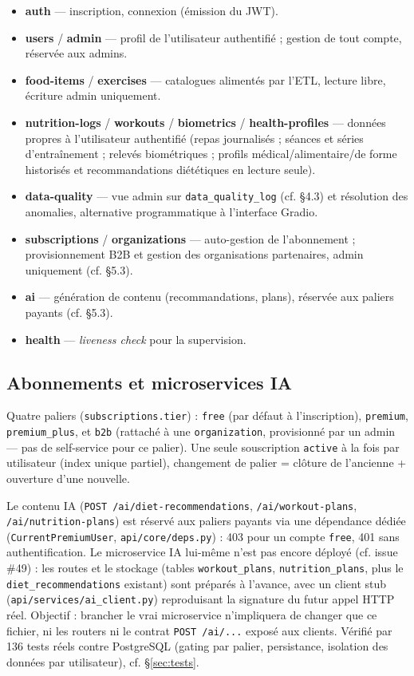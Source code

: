 \documentclass{article}
\begin{document}
\begin{itemize}[leftmargin=1.4em]
  \item \textbf{auth} — inscription, connexion (émission du JWT).
  \item \textbf{users} / \textbf{admin} — profil de l'utilisateur authentifié ; gestion de tout compte, réservée aux admins.
  \item \textbf{food-items} / \textbf{exercises} — catalogues alimentés par l'ETL, lecture libre, écriture admin uniquement.
  \item \textbf{nutrition-logs} / \textbf{workouts} / \textbf{biometrics} / \textbf{health-profiles} — données propres à l'utilisateur authentifié (repas journalisés ; séances et séries d'entraînement ; relevés biométriques ; profils médical/alimentaire/de forme historisés et recommandations diététiques en lecture seule).
  \item \textbf{data-quality} — vue admin sur \texttt{data\_quality\_log} (cf. \S4.3) et résolution des anomalies, alternative programmatique à l'interface Gradio.
  \item \textbf{subscriptions} / \textbf{organizations} — auto-gestion de l'abonnement ; provisionnement B2B et gestion des organisations partenaires, admin uniquement (cf. \S5.3).
  \item \textbf{ai} — génération de contenu (recommandations, plans), réservée aux paliers payants (cf. \S5.3).
  \item \textbf{health} — \textit{liveness check} pour la supervision.
\end{itemize}

\subsection{Abonnements et microservices IA}

Quatre paliers (\texttt{subscriptions.tier}) : \texttt{free} (par défaut à l'inscription), \texttt{premium}, \texttt{premium\_plus}, et \texttt{b2b} (rattaché à une \texttt{organization}, provisionné par un admin — pas de self-service pour ce palier). Une seule souscription \texttt{active} à la fois par utilisateur (index unique partiel), changement de palier = clôture de l'ancienne + ouverture d'une nouvelle.

Le contenu IA (\texttt{POST /ai/diet-recommendations}, \texttt{/ai/workout-plans}, \texttt{/ai/nutrition-plans}) est réservé aux paliers payants via une dépendance dédiée (\texttt{CurrentPremiumUser}, \texttt{api/core/deps.py}) : 403 pour un compte \texttt{free}, 401 sans authentification. Le microservice IA lui-même n'est pas encore déployé (cf. issue \#49) : les routes et le stockage (tables \texttt{workout\_plans}, \texttt{nutrition\_plans}, plus le \texttt{diet\_recommendations} existant) sont préparés à l'avance, avec un client stub (\texttt{api/services/ai\_client.py}) reproduisant la signature du futur appel HTTP réel. Objectif : brancher le vrai microservice n'impliquera de changer que ce fichier, ni les routers ni le contrat \texttt{POST /ai/...} exposé aux clients. Vérifié par 136 tests réels contre PostgreSQL (gating par palier, persistance, isolation des données par utilisateur), cf. \S\ref{sec:tests}.
\end{document}
